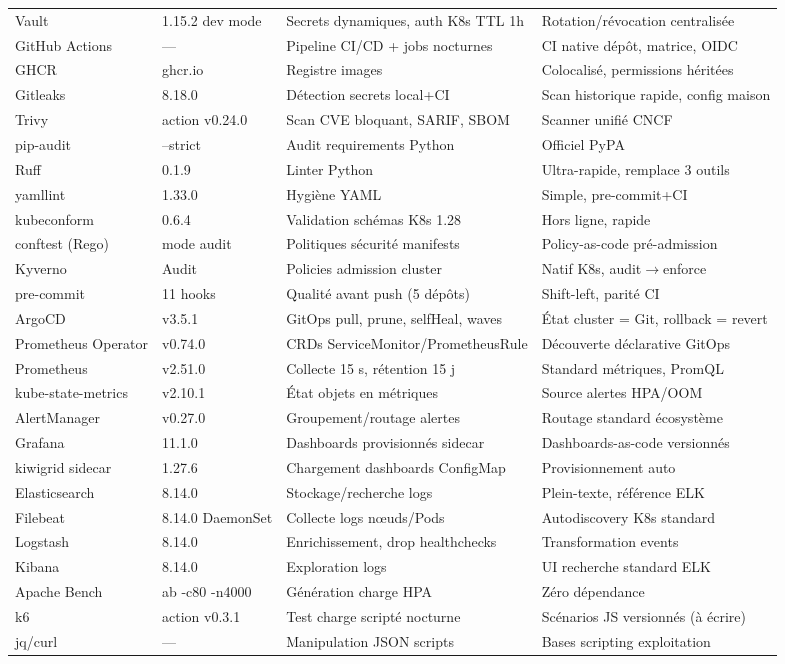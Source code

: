 \documentclass[12pt,a4paper,oneside]{report}
\begin{document}
{\begin{longtable}{@{}p{3.0cm}p{1.9cm}p{4.7cm}p{4.7cm}@{}}
Vault & 1.15.2 dev mode & Secrets dynamiques, auth K8s TTL 1h & Rotation/révocation centralisée \\
GitHub Actions & --- & Pipeline CI/CD + jobs nocturnes & CI native dépôt, matrice, OIDC \\
GHCR & ghcr.io & Registre images & Colocalisé, permissions héritées \\
Gitleaks & 8.18.0 & Détection secrets local+CI & Scan historique rapide, config maison \\
Trivy & action v0.24.0 & Scan CVE bloquant, SARIF, SBOM & Scanner unifié CNCF \\
pip-audit & --strict & Audit requirements Python & Officiel PyPA \\
Ruff & 0.1.9 & Linter Python & Ultra-rapide, remplace 3 outils \\
yamllint & 1.33.0 & Hygiène YAML & Simple, pre-commit+CI \\
kubeconform & 0.6.4 & Validation schémas K8s 1.28 & Hors ligne, rapide \\
conftest (Rego) & mode audit & Politiques sécurité manifests & Policy-as-code pré-admission \\
Kyverno & Audit & Policies admission cluster & Natif K8s, audit$\rightarrow$enforce \\
pre-commit & 11 hooks & Qualité avant push (5 dépôts) & Shift-left, parité CI \\
ArgoCD & v3.5.1 & GitOps pull, prune, selfHeal, waves & État cluster = Git, rollback = revert \\
Prometheus Operator & v0.74.0 & CRDs ServiceMonitor/PrometheusRule & Découverte déclarative GitOps \\
Prometheus & v2.51.0 & Collecte 15 s, rétention 15 j & Standard métriques, PromQL \\
kube-state-metrics & v2.10.1 & État objets en métriques & Source alertes HPA/OOM \\
AlertManager & v0.27.0 & Groupement/routage alertes & Routage standard écosystème \\
Grafana & 11.1.0 & Dashboards provisionnés sidecar & Dashboards-as-code versionnés \\
kiwigrid sidecar & 1.27.6 & Chargement dashboards ConfigMap & Provisionnement auto \\
Elasticsearch & 8.14.0 & Stockage/recherche logs & Plein-texte, référence ELK \\
Filebeat & 8.14.0 DaemonSet & Collecte logs nœuds/Pods & Autodiscovery K8s standard \\
Logstash & 8.14.0 & Enrichissement, drop healthchecks & Transformation events \\
Kibana & 8.14.0 & Exploration logs & UI recherche standard ELK \\
Apache Bench & ab -c80 -n4000 & Génération charge HPA & Zéro dépendance \\
k6 & action v0.3.1 & Test charge scripté nocturne & Scénarios JS versionnés (à écrire) \\
jq/curl & --- & Manipulation JSON scripts & Bases scripting exploitation \\
\bottomrule
\end{longtable}
}
\end{document}
